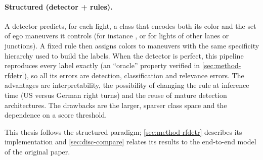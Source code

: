 \paragraph{Structured (detector + rules).} A detector predicts, for each light, a class that encodes
both its color and the set of ego maneuvers it controls (for instance , or
 for lights of other lanes or junctions). A fixed rule then assigns colors to
maneuvers with the same specificity hierarchy used to build the labels. When the detector is perfect,
this pipeline reproduces every label exactly (an ``oracle'' property verified in
\cref{sec:method-rfdetr}), so all its errors are detection, classification and relevance errors. The
advantages are interpretability, the possibility of changing the rule at inference time (US versus
German right turns) and the reuse of mature detection architectures. The drawbacks are the larger,
sparser class space and the dependence on a score threshold.

This thesis follows the structured paradigm; \cref{sec:method-rfdetr} describes its implementation and
\cref{sec:disc-compare} relates its results to the end-to-end model of the original paper.
